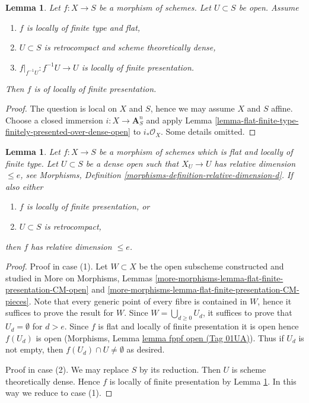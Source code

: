\documentclass{amsart}
\theoremstyle{plain}
\newtheorem{lemma}[subsection]{Lemma}
\theoremstyle{definition}
\theoremstyle{remark}
\numberwithin{equation}{subsection}
\begin{document}
\begin{lemma}
\label{lemma-flat-finite-type-finitely-presented-over-dense-open-X}
Let $f : X \to S$ be a morphism of schemes. Let $U \subset S$ be open.
Assume
\begin{enumerate}
\item $f$ is locally of finite type and flat,
\item $U \subset S$ is retrocompact and scheme theoretically dense,
\item $f|_{f^{-1}U} : f^{-1}U \to U$ is locally of finite presentation.
\end{enumerate}
Then $f$ is of locally of finite presentation.
\end{lemma}

\begin{proof}
The question is local on $X$ and $S$, hence we may assume $X$ and
$S$ affine. Choose a closed immersion $i : X \to \mathbf{A}^n_S$
and apply
Lemma \ref{lemma-flat-finite-type-finitely-presented-over-dense-open}
to $i_*\mathcal{O}_X$. Some details omitted.
\end{proof}


\begin{lemma}
\label{lemma-flat-finite-presentation-dimension-over-dense-open}
Let $f : X \to S$ be a morphism of schemes which is flat and locally
of finite type. Let $U \subset S$ be a dense open such that
$X_U \to U$ has relative dimension $\leq e$, see
Morphisms, Definition \ref{morphisms-definition-relative-dimension-d}.
If also either
\begin{enumerate}
\item $f$ is locally of finite presentation, or
\item $U \subset S$ is retrocompact,
\end{enumerate}
then $f$ has relative dimension $\leq e$.
\end{lemma}

\begin{proof}
Proof in case (1). Let $W \subset X$ be the open subscheme constructed
and studied in More on Morphisms, Lemmas
\ref{more-morphisms-lemma-flat-finite-presentation-CM-open} and
\ref{more-morphisms-lemma-flat-finite-presentation-CM-pieces}.
Note that every generic point of every fibre is contained in $W$,
hence it suffices to prove the result for $W$. Since
$W = \bigcup_{d \geq 0} U_d$, it suffices to prove that $U_d = \emptyset$
for $d > e$. Since $f$ is flat and locally of finite presentation it is open
hence $f(U_d)$ is open (Morphisms, Lemma \href{https://stacks.math.columbia.edu/tag/01UA}{lemma fppf open (Tag 01UA)}).
Thus if $U_d$ is not empty, then $f(U_d) \cap U \not = \emptyset$ as
desired.

\medskip\noindent
Proof in case (2). We may replace $S$ by its reduction. Then $U$ is
scheme theoretically dense. Hence $f$ is locally of finite presentation
by Lemma \ref{lemma-flat-finite-type-finitely-presented-over-dense-open-X}.
In this way we reduce to case (1).
\end{proof}
\end{document}
